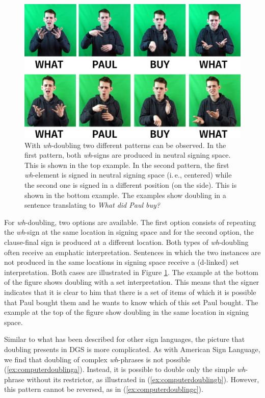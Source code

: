\begin{figure}[bt]
\centering
	\includegraphics[width=1.0\textwidth]{whdoubling.jpg}
	\caption{With \textit{wh}-doubling two different patterns can be observed. In the first pattern, both \textit{wh}-signs are produced in neutral signing space. This is shown in the top example. In the second pattern, the first \textit{wh}-element is signed in neutral signing space (i.\,e., centered) while the second one is signed in a different position (on the side). This is shown in the bottom example. The examples show doubling in a sentence translating to \textit{What did Paul buy?}}
	\label{whdoubling}
\end{figure}

For \textit{wh}-doubling, two options are available. The first option consists of repeating the \textit{wh}-sign at the same location in signing space and for the second option, the clause-final sign is produced at a different location. Both types of \textit{wh}-doubling often receive an emphatic interpretation. Sentences in which the two instances are not produced in the same locations in signing space receive a (d-linked) set interpretation. Both cases are illustrated in Figure \ref{whdoubling}. The example at the bottom of the figure shows doubling with a set interpretation. This means that the signer indicates that it is clear to him that there is a set of items of which it is possible that Paul bought them and he wants to know which of this set Paul bought. The example at the top of the figure show doubling in the same location in signing space. 

Similar to what has been described for other sign languages, the picture that doubling presents in DGS is more complicated. As with American Sign Language, we find that doubling of complex \textit{wh}-phrases is not possible (\ref{ex:computerdoublinga}). Instead, it is possible to double only the simple \textit{wh}-phrase without its restrictor, as illustrated in (\ref{ex:computerdoublingb}). However, this pattern cannot be reversed, as in (\ref{ex:computerdoublingc}).

